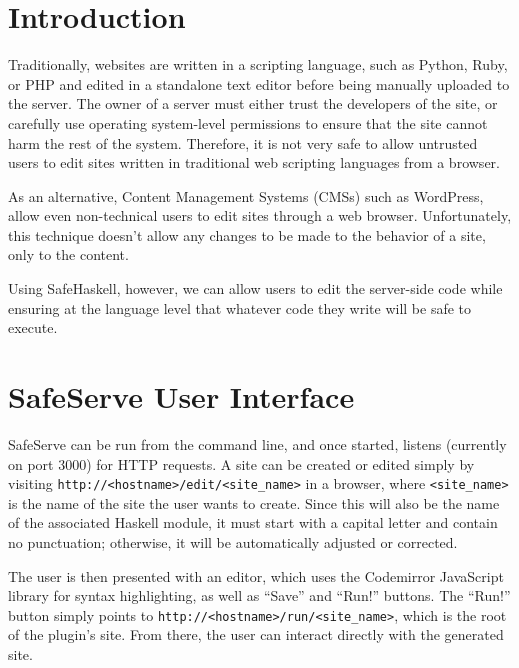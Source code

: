 \documentclass[12pt]{article}
\begin{document}
\maketitle


\section{Introduction}
Traditionally, websites are written in a scripting language,
such as Python, Ruby, or PHP and edited in a standalone text
editor before being manually uploaded to the server.
The owner of a server must either trust the developers of the site,
or carefully use operating system-level permissions to ensure that
the site cannot harm the rest of the system.  Therefore, it is not
very safe to allow untrusted users to edit sites written in
traditional web scripting languages from a browser.

As an alternative, Content Management Systems (CMSs) such as
WordPress, allow even non-technical users to edit sites through
a web browser.  Unfortunately, this technique doesn't allow any
changes to be made to the behavior of a site, only to the content.

Using SafeHaskell, however, we can allow users to edit the server-side
code while ensuring at the language level that whatever code they
write will be safe to execute.

\section{SafeServe User Interface}
SafeServe can be run from the command line, and once started, listens
(currently on port 3000) for HTTP requests.  A site can be created
or edited simply by visiting \verb+http://<hostname>/edit/<site_name>+ in a browser,
where \verb+<site_name>+ is the name of the site the user wants to create.
Since this will also be the name of the associated Haskell module,
it must start with a capital letter and contain no punctuation; otherwise,
it will be automatically adjusted or corrected.

The user is then presented with an editor, which uses the Codemirror JavaScript
library for syntax highlighting, as well as ``Save'' and ``Run!'' buttons.
The ``Run!'' button simply points to \verb+http://<hostname>/run/<site_name>+,
which is the root of the plugin's site.  From there, the user can interact
directly with the generated site.
\end{document}
